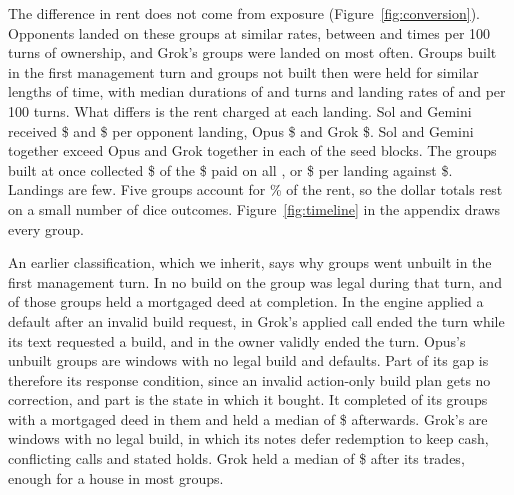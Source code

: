 The difference in rent does not come from exposure (Figure~\ref{fig:conversion}). Opponents landed on these groups at similar rates, between  and  times per 100 turns of ownership, and Grok's groups were landed on most often. Groups built in the first management turn and groups not built then were held for similar lengths of time, with median durations of  and  turns and landing rates of  and  per 100 turns. What differs is the rent charged at each landing. Sol and Gemini received \$ and \$ per opponent landing, Opus \$ and Grok \$. Sol and Gemini together exceed Opus and Grok together in each of the  seed blocks. The  groups built at once collected \$ of the \$ paid on all , or \$ per landing against \$. Landings are few. Five groups account for \% of the rent, so the dollar totals rest on a small number of dice outcomes. Figure~\ref{fig:timeline} in the appendix draws every group.

An earlier classification, which we inherit, says why  groups went unbuilt in the first management turn. In  no build on the group was legal during that turn, and  of those groups held a mortgaged deed at completion. In  the engine applied a default after an invalid build request, in  Grok's applied call ended the turn while its text requested a build, and in  the owner validly ended the turn. Opus's  unbuilt groups are  windows with no legal build and  defaults. Part of its gap is therefore its response condition, since an invalid action-only build plan gets no correction, and part is the state in which it bought. It completed  of its  groups with a mortgaged deed in them and held a median of \$ afterwards. Grok's  are  windows with no legal build, in which its notes defer redemption to keep cash,  conflicting calls and  stated holds. Grok held a median of \$ after its trades, enough for a house in most groups.


